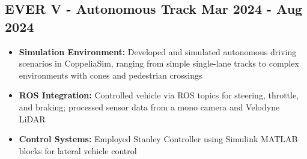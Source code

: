 \subsection*{
  EVER V - Autonomous Track
  \hspace*{\fill}
  \dateformat Mar 2024 - Aug 2024
}
\begin{itemize}
  \item \textbf{Simulation Environment:} Developed and simulated autonomous driving scenarios in CoppeliaSim, ranging from simple single-lane tracks to complex environments with cones and pedestrian crossings
  \item \textbf{ROS Integration:} Controlled vehicle via ROS topics for steering, throttle, and braking; processed sensor data from a mono camera and Velodyne LiDAR
  \item \textbf{Control Systems:} Employed Stanley Controller using Simulink MATLAB blocks for lateral vehicle control
\end{itemize}
%
%

